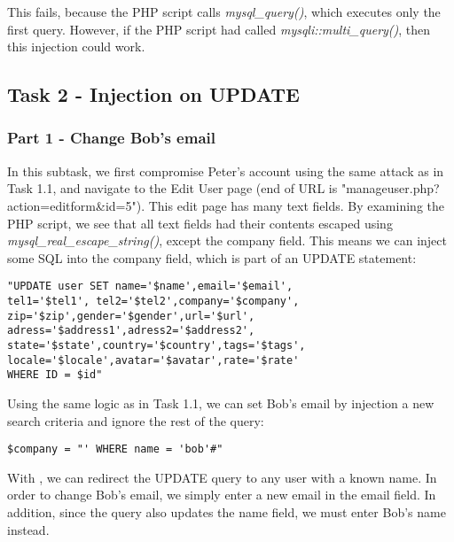 This fails, because the PHP script calls \emph{mysql\_query()}, which executes only the first query. However, if the PHP script had called \emph{mysqli::multi\_query()}, then this injection could work.

\subsection{Task 2 - Injection on UPDATE}
\subsubsection{Part 1 - Change Bob's email} \label{l4_t2p1}
In this subtask, we first compromise Peter's account using the same attack as in Task 1.1, and navigate to the Edit User page (end of URL is "manageuser.php?action=editform\&id=5"). This edit page has many text fields. By examining the PHP script, we see that all text fields had their contents escaped using \emph{mysql\_real\_escape\_string()}, except the company field. This means we can inject some SQL into the company field, which is part of an UPDATE statement:

\begin{minipage}{\linewidth}
\begin{lstlisting}[caption={UPDATE statement from the edit form},
label={lst:l4_t2p1_updq},
frame=single]
"UPDATE user SET name='$name',email='$email',
tel1='$tel1', tel2='$tel2',company='$company',
zip='$zip',gender='$gender',url='$url',
adress='$address1',adress2='$address2',
state='$state',country='$country',tags='$tags',
locale='$locale',avatar='$avatar',rate='$rate'
WHERE ID = $id"
\end{lstlisting}
\end{minipage}

Using the same logic as in Task 1.1, we can set Bob's email by injection a new search criteria and ignore the rest of the query:

\begin{minipage}{\linewidth}
\begin{lstlisting}[caption={UPDATE statement redirection},
label={lst:l4_t2p1_compatk},
frame=single]
$company = "' WHERE name = 'bob'#"
\end{lstlisting}
\end{minipage}

With , we can redirect the UPDATE query to any user with a known name. In order to change Bob's email, we simply enter a new email in the email field. In addition, since the query also updates the name field, we must enter Bob's name instead.


